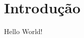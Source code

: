 \documentclass[12pt,oneside,a4paper,english,brazil]{abntex2}
\begin{document}
\imprimircapa
\textual

\chapter{Introdução}
Hello World!
\end{document}
